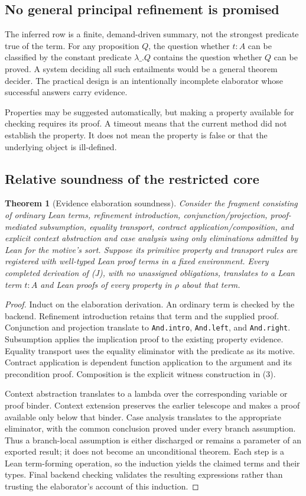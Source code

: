 \documentclass[11pt,letterpaper]{article}
\newcommand{\code}[1]{\nolinkurl{#1}}
\newtheorem{theorem}{Theorem}[section]
\theoremstyle{definition}
\theoremstyle{remark}
\begin{document}
\subsection{No general principal refinement is promised}
The inferred row is a finite, demand-driven summary, not the strongest predicate
true of the term. For any proposition $Q$, the question whether $t:A$ can be
classified by the constant predicate $\lambda\_.Q$ contains the question whether
$Q$ can be proved. A system deciding all such entailments would be a general
theorem decider. The practical design is an intentionally incomplete elaborator
whose successful answers carry evidence.

Properties may be suggested automatically, but making a property available for
checking requires its proof. A timeout means that the current method did not
establish the property. It does not mean the property is false or that the
underlying object is ill-defined.

\subsection{Relative soundness of the restricted core}
\begin{theorem}[Evidence elaboration soundness]\label{thm:sound}
Consider the fragment consisting of ordinary Lean terms, refinement
introduction, conjunction/projection, proof-mediated subsumption, equality
transport, contract application/composition, and explicit context abstraction
and case analysis using only eliminations admitted by Lean for the motive's
sort. Suppose its primitive property and transport rules are
registered with well-typed Lean proof terms in a fixed environment. Every
completed derivation of (J), with no unassigned obligations, translates to a
Lean term $t:A$ and Lean proofs of every property in $\rho$ about that term.
\end{theorem}
\begin{proof}
Induct on the elaboration derivation. An ordinary term is checked by the backend.
Refinement introduction retains that term and the supplied proof. Conjunction
and projection translate to \code{And.intro}, \code{And.left}, and
\code{And.right}. Subsumption applies the implication proof to the existing
property evidence. Equality transport uses the equality eliminator with the
predicate as its motive. Contract application is dependent function application
to the argument and its precondition proof. Composition is the explicit witness
construction in (3).

Context abstraction translates to a lambda over the corresponding variable or
proof binder. Context extension preserves the earlier telescope and makes a
proof available only below that binder. Case analysis translates to the
appropriate eliminator, with the common conclusion proved under every branch
assumption. Thus a branch-local assumption is either discharged or remains a
parameter of an exported result; it does not become an unconditional theorem.
Each step is a Lean term-forming operation, so the induction yields the claimed
terms and their types. Final backend checking validates the resulting
expressions rather than trusting the elaborator's account of this induction.
\end{proof}
\end{document}
